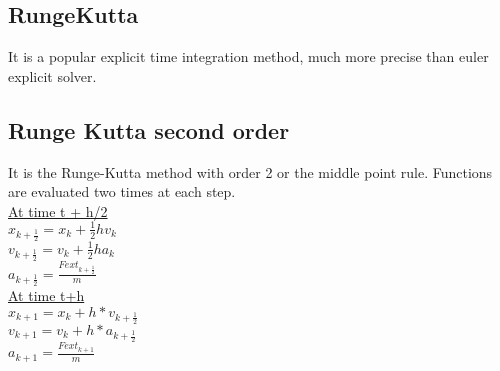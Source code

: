 \documentclass[12pt]{article}
\begin{document}
\begin{doublespace}
\section{RungeKutta}
It is a popular explicit time integration method, much more precise than euler explicit solver.

\subsection{Runge Kutta second order}
It is the Runge-Kutta method with order 2 or the middle point rule. Functions are evaluated two times at each step.
\\ \underline {At time t + h/2}
\\$ x_{k+\frac{1}{2}} = x_{k}+\frac{1}{2}hv_{k}$
\\$ v_{k+\frac{1}{2}} = v_{k}+\frac{1}{2}ha_{k} $
\\$ a_{k+\frac{1}{2}} = \frac{Fext_{k+\frac{1}{2}}}{m}$
\\ \underline {At time t+h}
\\$x_{k+1} = x_{k}+h*v_{k+\frac{1}{2}}$
\\$v_{k+1} = v_{k}+h*a_{k+\frac{1}{2}}$
\\$a_{k+1} = \frac{Fext_{k+1}}{m}$


\end{doublespace}
\end{document}
